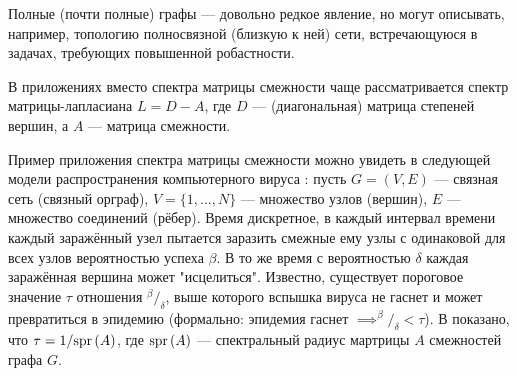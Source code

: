Полные (почти полные) графы --- довольно редкое явление,
но могут описывать, например, топологию полносвязной (близкую к ней) сети,
встречающуюся в задачах, требующих повышенной робастности.

В приложениях вместо спектра матрицы смежности чаще рассматривается
спектр матрицы-лапласиана \( L = D - A \),
где \( D \) --- (диагональная) матрица степеней вершин,
а \( A \) --- матрица смежности.

Пример приложения спектра матрицы смежности можно увидеть
в следующей модели распространения компьютерного вируса \cite{epidemic-eigenvalues}:
пусть \( G = (V, E) \) --- связная сеть (связный орграф),
\( V = \{1, \ldots, N\} \) --- множество узлов (вершин),
\( E \) --- множество соединений (рёбер).
Время дискретное, в каждый интервал времени каждый заражённый узел
пытается заразить смежные ему узлы с одинаковой для всех узлов вероятностью успеха \( \beta \).
В то же время с вероятностью \( \delta \) каждая заражённая вершина может "исцелиться".
Известно, существует пороговое значение \( \tau \) отношения \( {^\beta}/_{\delta} \),
выше которого вспышка вируса не гаснет и может превратиться в эпидемию
(формально: эпидемия гаснет \( \implies ^{\beta}/_{\delta} < \tau \)).
В \cite{epidemic-eigenvalues} показано, что \( \tau = 1/\mathrm{spr}\left({A}\right) \),
где \( \mathrm{spr}\left({A}\right) \) --- спектральный радиус мартрицы \( A \) смежностей графа \( G \).
